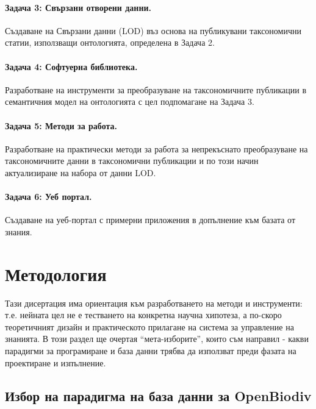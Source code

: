 \paragraph{Задача 3: Свързани отворени данни.} Създаване на Свързани данни (LOD) въз основа на публикувани таксономични статии, използващи онтологията, определена в Задача 2.

\paragraph{Задача 4: Софтуерна библиотека.} Разработване на инструменти за преобразуване на таксономичните публикации в семантичния модел на онтологията с цел подпомагане на Задача 3.

\paragraph{Задача 5: Методи за работа.}

Разработване на практически методи за работа за непрекъснато преобразуване на таксономичните данни в таксономични публикации и по този начин актуализиране на набора от данни LOD.

\paragraph{Задача 6: Уеб портал.} Създаване на уеб-портал с примерни приложения в допълнение към базата от знания.

\section*{Методология}

Тази дисертация има ориентация към разработването на методи и инструменти: т.е. нейната цел не е тестването на конкретна научна хипотеза, а по-скоро теоретичният дизайн и практическото прилагане на система за управление на знанията. В този раздел ще очертая ``мета-изборите'', които съм направил - какви парадигми за програмиране и база данни трябва да използват преди фазата на проектиране и изпълнение.

\subsection*{Избор на парадигма на база данни за OpenBiodiv}


